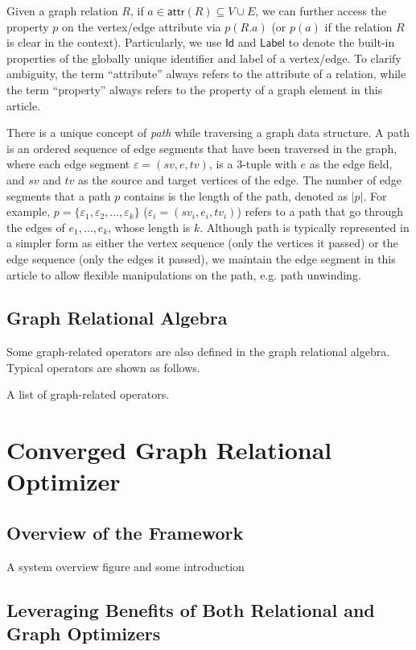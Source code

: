 \documentclass[sigconf, nonacm]{acmart}
\newcommand{\kw}[1]{{\ensuremath {\mathsf{#1}}}\xspace}
\newcommand{\attr}{\kw{attr}}
\newcommand{\lab}{\kw{Label}}
\newcommand{\id}{\kw{Id}}
\begin{document}
Given a graph relation $R$, if $a \in \attr(R) \subseteq V \cup E$, we can further access the property $p$ on the vertex/edge attribute via $p(R.a)$ (or $p(a)$ if the relation $R$ is clear in the context). 
Particularly, we use $\id$ and $\lab$ to denote the built-in properties of the globally unique identifier and label of a vertex/edge. 
To clarify ambiguity, the term ``attribute'' always refers to the attribute of a relation, while the term ``property'' always refers to the property of a graph element in this article.

There is a unique concept of \emph{path} while traversing a graph data structure. 
A path is an ordered sequence of edge segments that have been traversed in the graph, where each edge segment $\varepsilon = (sv, e, tv)$, is a 3-tuple with $e$ as the edge field, and $sv$ and $tv$ as the source and target vertices of the edge. 
The number of edge segments that a path $p$ contains is the length of the path, denoted as $|p|$. For example, $ p = \{\varepsilon_1, \varepsilon_2, \ldots, \varepsilon_k\}$ ($\varepsilon_i = (sv_i, e_i, tv_i)$) refers to a path that go through the edges of $e_1, \ldots, e_k$, whose length is $k$. 
Although path is typically represented in a simpler form as either the vertex sequence (only the vertices it passed) or the edge sequence (only the edges it passed), we maintain the edge segment in this article to allow flexible manipulations on the path, e.g. path unwinding. 

\subsection{Graph Relational Algebra}

Some graph-related operators are also defined in the graph relational algebra.
Typical operators are shown as follows.

A list of graph-related operators.


\section{Converged Graph Relational Optimizer}

\subsection{Overview of the Framework}

A system overview figure and some introduction

\subsection{Leveraging Benefits of Both Relational and Graph Optimizers}
\end{document}
